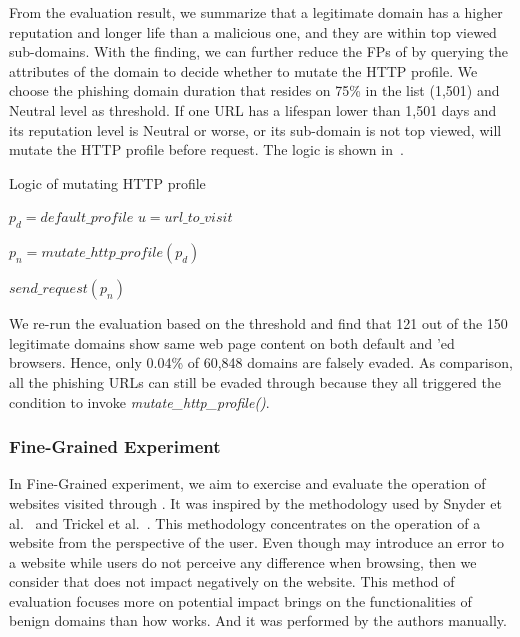 From the evaluation result, we summarize that a legitimate domain has a higher reputation and longer life than a malicious one, and they are within top viewed sub-domains.
With the finding, we can further reduce the FPs of \spartacus by querying the attributes of the domain to decide whether to mutate the HTTP profile.
We choose the phishing domain duration that resides on 75\% in the list (1,501) and Neutral level as threshold.
If one URL has a lifespan lower than 1,501 days and its reputation level is Neutral or worse, or its sub-domain is not top viewed, \spartacus will mutate the HTTP profile before request.
The logic is shown in~.

\begin{algorithm}
  \caption{Logic of mutating HTTP profile}
\begin{algorithmic}[1]

\State $p_d = default\_profile$
\State $u = url\_to\_visit$

    \State $p_n = mutate\_http\_profile(p_d)$
\EndIf

\State $send\_request(p_n)$

\end{algorithmic}
\label{alg:mutatelogic}
\end{algorithm}

We re-run the evaluation based on the threshold and find that 121 out of the 150 legitimate domains show same web page content on both default and \spartacus'ed browsers.
Hence, only 0.04\% of 60,848 domains are falsely evaded.
As comparison, all the phishing URLs can still be evaded through \spartacus because they all triggered the condition to invoke \emph{mutate\_http\_profile()}.

\subsubsection{Fine-Grained Experiment}

In Fine-Grained experiment, we aim to exercise and evaluate the operation of websites visited through \spartacus.
It was inspired by the methodology used by Snyder et al.~\cite{snyder2017most} and Trickel et al.~\cite{trickel2019everyone}.
This methodology concentrates on the operation of a website from the perspective of the user.
Even though \spartacus may introduce an error to a website while users do not perceive any difference when browsing, then we consider that \spartacus does not impact negatively on the website.
This method of evaluation focuses more on potential impact \spartacus brings on the functionalities of benign domains than how \spartacus works.
And it was performed by the authors manually.

